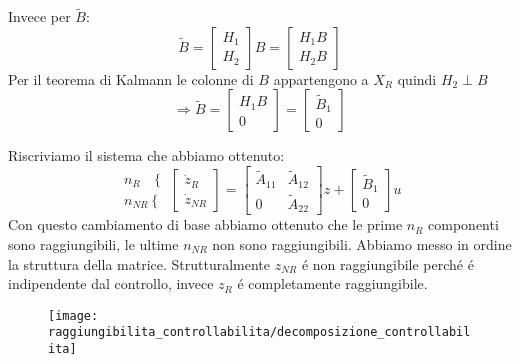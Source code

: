 \documentclass[../main.tex]{subfiles}
\begin{document}
		Invece per $ \tilde B $:
		\[
			\tilde B=
			\begin{bmatrix}
				H_1\\
				H_2
			\end{bmatrix} B =
			\begin{bmatrix}
				H_1 B\\
				H_2 B
			\end{bmatrix}
		\]
		Per il teorema di Kalmann le colonne di $ B $ appartengono a $ X_R $ quindi $ H_2 \perp B $
		\[
			\Rightarrow \tilde B =
			\begin{bmatrix}
				H_1 B\\
				0
			\end{bmatrix} =
			\begin{bmatrix}
					\tilde B_1\\
					0
			\end{bmatrix}
		\]
		
		Riscriviamo il sistema che abbiamo ottenuto:
		\[
			\begin{matrix}
				n_R \phantom{R} \left\lbrace \right.\\
				n_{NR} \left\lbrace \right.
			\end{matrix}
			\begin{bmatrix}
				\dot z_R\\
				\dot z_{NR}
			\end{bmatrix} =
			\begin{bmatrix}
				\tilde A_{11} & \tilde A_{12}\\
				0 & \tilde A_{22}
			\end{bmatrix} z +
			\begin{bmatrix}
				\tilde B_1\\
				0
			\end{bmatrix} u
		\]
		Con questo cambiamento di base abbiamo ottenuto che le prime $ n_R $ componenti sono raggiungibili, le ultime $ n_{NR} $ non sono raggiungibili. Abbiamo messo in ordine la struttura della matrice. Strutturalmente $ z_{NR} $ \'e non raggiungibile perch\'e \'e indipendente dal controllo, invece $ z_R $ \'e completamente raggiungibile.
		\begin{figure}[H]
			\centering\texttt{[image: raggiungibilita\_controllabilita/decomposizione\_controllabilita]}
		\end{figure}
		
\end{document}
